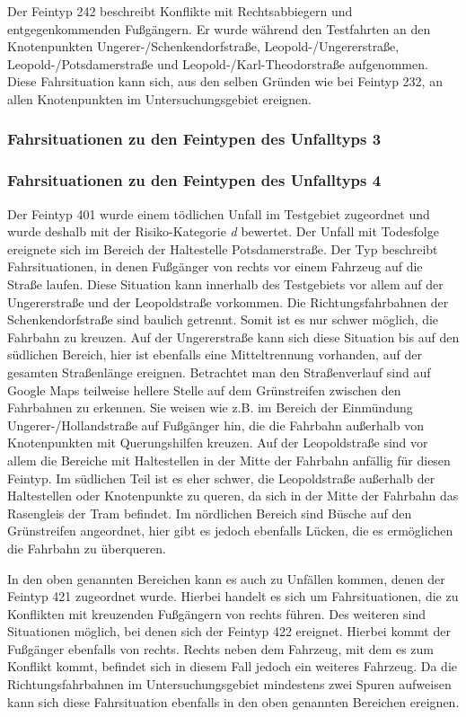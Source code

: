 Der Feintyp 242 beschreibt Konflikte mit Rechtsabbiegern und entgegenkommenden Fußgängern. Er wurde während den Testfahrten an den Knotenpunkten Ungerer-/Schenkendorfstraße, Leopold-/Ungererstraße, Leopold-/Potsdamerstraße und Leopold-/Karl-Theodorstraße aufgenommen. Diese Fahrsituation kann sich, aus den selben Gründen wie bei Feintyp 232, an allen Knotenpunkten im Untersuchungsgebiet ereignen. 

\subsubsection{Fahrsituationen zu den Feintypen des Unfalltyps 3}


\subsubsection{Fahrsituationen zu den Feintypen des Unfalltyps 4}
Der Feintyp 401 wurde einem tödlichen Unfall im Testgebiet zugeordnet und wurde deshalb mit der Risiko-Kategorie \textit{d} bewertet. Der Unfall mit Todesfolge ereignete sich im Bereich der Haltestelle Potsdamerstraße. Der Typ beschreibt Fahrsituationen, in denen Fußgänger von rechts vor einem Fahrzeug auf die Straße laufen. Diese Situation kann innerhalb des Testgebiets vor allem auf der Ungererstraße und der Leopoldstraße vorkommen. Die Richtungsfahrbahnen der Schenkendorfstraße sind baulich getrennt. Somit ist es nur schwer möglich, die Fahrbahn zu kreuzen. Auf der Ungererstraße kann sich diese Situation bis auf den südlichen Bereich, hier ist ebenfalls eine Mitteltrennung vorhanden, auf der gesamten Straßenlänge ereignen. Betrachtet man den Straßenverlauf sind auf Google Maps teilweise hellere Stelle auf dem Grünstreifen zwischen den Fahrbahnen zu erkennen. Sie weisen wie z.B. im Bereich der Einmündung Ungerer-/Hollandstraße auf Fußgänger hin, die die Fahrbahn außerhalb von Knotenpunkten mit Querungshilfen kreuzen. Auf der Leopoldstraße sind vor allem die Bereiche mit Haltestellen in der Mitte der Fahrbahn anfällig für diesen Feintyp. Im südlichen Teil ist es eher schwer, die Leopoldstraße außerhalb der Haltestellen oder Knotenpunkte zu queren, da sich in der Mitte der Fahrbahn das Rasengleis der Tram befindet. Im nördlichen Bereich sind Büsche auf den Grünstreifen angeordnet, hier gibt es jedoch ebenfalls Lücken, die es ermöglichen die Fahrbahn zu überqueren.

In den oben genannten Bereichen kann es auch zu Unfällen kommen, denen der Feintyp 421 zugeordnet wurde. Hierbei handelt es sich um Fahrsituationen, die zu Konflikten mit kreuzenden Fußgängern von rechts führen. Des weiteren sind Situationen möglich, bei denen sich der Feintyp 422 ereignet. Hierbei kommt der Fußgänger ebenfalls von rechts. Rechts neben dem Fahrzeug, mit dem es zum Konflikt kommt, befindet sich in diesem Fall jedoch ein weiteres Fahrzeug. Da die Richtungsfahrbahnen im Untersuchungsgebiet mindestens zwei Spuren aufweisen kann sich diese Fahrsituation ebenfalls in den oben genannten Bereichen ereignen.

